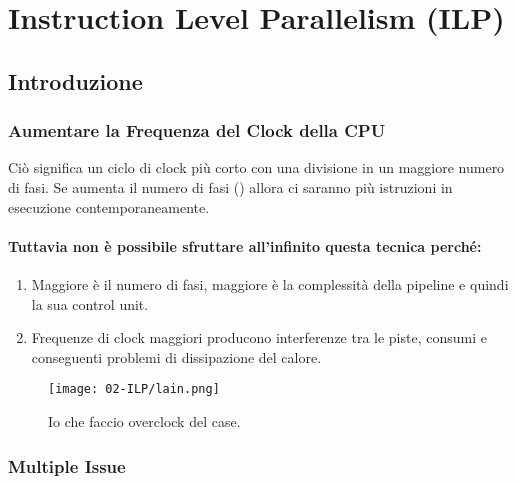 \chapter{Instruction Level Parallelism (ILP)}

\section{Introduzione}


\subsection{Aumentare la Frequenza del Clock della CPU} 

Ciò significa un ciclo di clock più corto con una divisione in un maggiore numero di fasi. Se aumenta il numero di fasi () allora ci saranno più istruzioni in esecuzione contemporaneamente. 


\subsubsection{Tuttavia non è possibile sfruttare all'infinito questa tecnica perché:}

\begin{enumerate}
  \item Maggiore è il numero di fasi, maggiore è la complessità della pipeline e quindi la sua control unit. 
  \item Frequenze di clock maggiori producono interferenze tra le piste, consumi e conseguenti problemi di dissipazione del calore.
\end{enumerate}


\pagebreak

\begin{figure}[!h]
    \centering
    \texttt{[image: 02-ILP/lain.png]}
    \caption{Io che faccio overclock del case.}
\end{figure}

\subsection{Multiple Issue}





